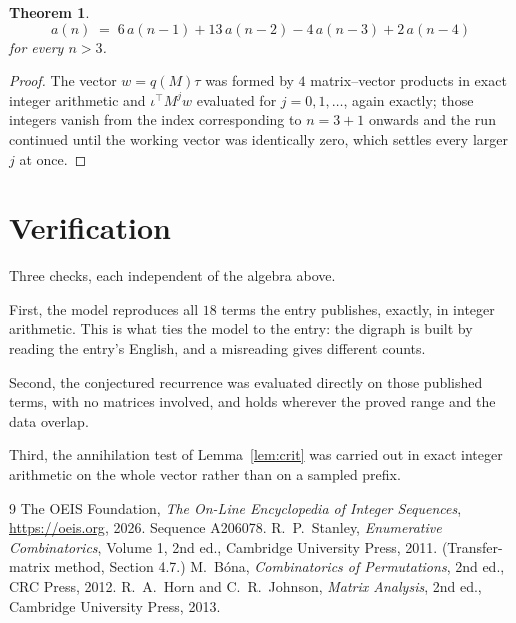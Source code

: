 \documentclass[11pt,a4paper]{article}
\theoremstyle{plain}
\newtheorem{theorem}{Theorem}
\theoremstyle{definition}
\begin{document}
\begin{theorem}
\[
a(n)\;=\;6\,a(n-1) + 13\,a(n-2) - 4\,a(n-3) + 2\,a(n-4)
\]
for every $n>3$.
\end{theorem}

\begin{proof}
The vector $w=q(M)\tau$ was formed by $4$ matrix--vector products in exact integer
arithmetic and $\iota^{\!\top}M^{j}w$ evaluated for $j=0,1,\dots$, again exactly; those
integers vanish from the index corresponding to $n=3+1$ onwards and the run continued
until the working vector was identically zero, which settles every larger $j$ at once.
\end{proof}

\section{Verification}

Three checks, each independent of the algebra above.

First, the model reproduces all $18$ terms the entry publishes, exactly, in integer
arithmetic. This is what ties the model to the entry: the digraph is built by reading the
entry's English, and a misreading gives different counts.

Second, the conjectured recurrence was evaluated directly on those published terms, with no
matrices involved, and holds wherever the proved range and the data overlap.

Third, the annihilation test of Lemma~\ref{lem:crit} was carried out in exact integer
arithmetic on the whole vector rather than on a sampled prefix.

\begin{thebibliography}{9}
 The OEIS Foundation, \emph{The On-Line Encyclopedia of Integer
Sequences}, \url{https://oeis.org}, 2026. Sequence A206078.
 R.~P.~Stanley, \emph{Enumerative Combinatorics}, Volume 1, 2nd ed.,
Cambridge University Press, 2011. (Transfer-matrix method, Section 4.7.)
 M.~B\'ona, \emph{Combinatorics of Permutations}, 2nd ed., CRC
Press, 2012.
 R.~A.~Horn and C.~R.~Johnson, \emph{Matrix Analysis}, 2nd ed., Cambridge
University Press, 2013.
\end{thebibliography}
\end{document}
